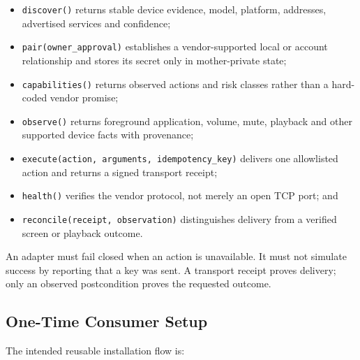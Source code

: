 \begin{itemize}
  \item \texttt{discover()} returns stable device evidence, model, platform,
        addresses, advertised services and confidence;
  \item \texttt{pair(owner\_approval)} establishes a vendor-supported local or
        account relationship and stores its secret only in mother-private state;
  \item \texttt{capabilities()} returns observed actions and risk classes rather
        than a hard-coded vendor promise;
  \item \texttt{observe()} returns foreground application, volume, mute,
        playback and other supported device facts with provenance;
  \item \texttt{execute(action, arguments, idempotency\_key)} delivers one
        allowlisted action and returns a signed transport receipt;
  \item \texttt{health()} verifies the vendor protocol, not merely an open TCP
        port; and
  \item \texttt{reconcile(receipt, observation)} distinguishes delivery from a
        verified screen or playback outcome.
\end{itemize}

An adapter must fail closed when an action is unavailable. It must not simulate
success by reporting that a key was sent. A transport receipt proves delivery;
only an observed postcondition proves the requested outcome.

\subsection{One-Time Consumer Setup}

The intended reusable installation flow is:

